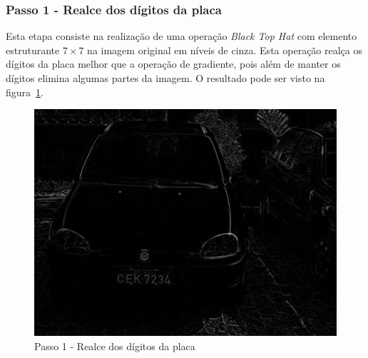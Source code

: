 \documentclass[11pt]{article} %
\begin{document}
\subsubsection{Passo 1 - Realce dos dígitos da placa}
	Esta etapa consiste na realização de uma operação \emph{Black Top Hat} com elemento estruturante $7\times7$ na imagem original em níveis de cinza. Esta operação realça os dígitos da placa melhor que a operação de gradiente, pois além de manter os dígitos elimina algumas partes da imagem. O resultado pode ser visto na figura~\ref{step0}.
	\begin{figure}[!h]
		\begin{center}
		\includegraphics[scale=0.5]{img_relatorio/step0.png}
		\caption{Passo 1 - Realce dos dígitos da placa}\label{step0}
		\end{center}
	\end{figure}
\newpage
\end{document}
